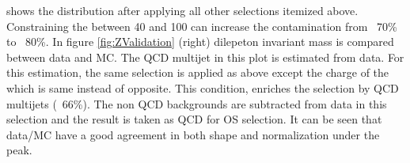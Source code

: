 shows the \tauMT distribution after applying all other selections itemized above. Constraining the \tauMT between 40 and 100 \GeV can increase the \Z contamination from ~70\% to ~80\%. In figure \ref{fig:ZValidation} (right)
dilepeton invariant mass is compared between data and MC. The QCD multijet in this plot is estimated from data. For this estimation, the same 
selection is applied as above except the charge of the \muTau which is same instead of opposite. This condition, enriches the selection 
by QCD multijets (~66\%). The non QCD backgrounds are subtracted from data in this selection and the result is taken as QCD for OS selection.
It can be seen that data/MC have a good agreement in both shape and normalization under the \Z peak. 
